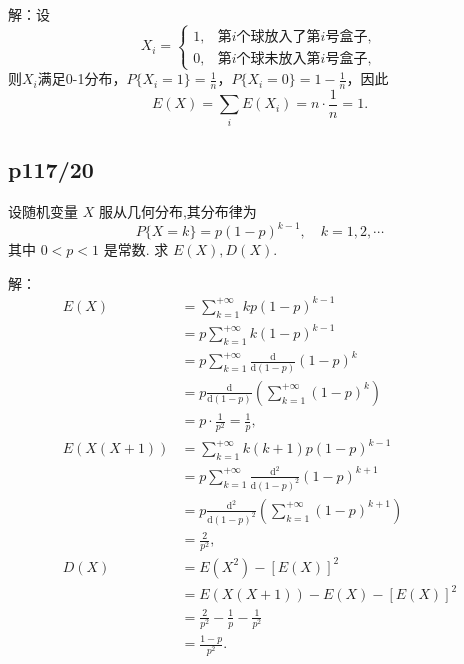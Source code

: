 \documentclass[UTF8,a4paper,10pt]{ctexart}
\begin{document}
解：设
\begin{equation}
    X_i = \left\{
    \begin{array}{lr}
    1,& \mbox{第$i$个球放入了第$i$号盒子}, \\
    0, & \mbox{第$i$个球未放入第$i$号盒子},
    \end{array}
    \right.
\end{equation}
则$X_i$满足0-1分布，$P\{X_i = 1\} = \displaystyle\frac{1}{n}$，$P\{X_i = 0\} = 1-\displaystyle\frac{1}{n}$，因此
\begin{equation}
    E(X) = \sum_i E(X_i) = n\cdot\frac{1}{n} = 1.
\end{equation}


\newpage
\subsection{p117/20}
设随机变量 $X$ 服从几何分布,其分布律为
$$
P\{X=k\}=p(1-p)^{k-1}, \quad k=1,2, \cdots
$$
其中 $0<p<1$ 是常数. 求 $E(X), D(X)$.

解：
\begin{align}
    E(X) &= \sum_{k = 1}^{+\infty}kp(1-p)^{k-1} \nonumber \\
         &= p\sum_{k = 1}^{+\infty}k(1-p)^{k-1} \nonumber \\
         &= p\sum_{k = 1}^{+\infty}\frac{\text{d}}{\text{d} (1 - p)}(1 - p)^k \nonumber \\
         &= p\frac{\text{d}}{\text{d} (1 - p)}\left(\sum_{k = 1}^{+\infty}(1 - p)^k\right) \nonumber \\
         &= p\cdot\frac{1}{p^2} = \frac{1}{p},\\
    E(X(X + 1)) &= \sum_{k = 1}^{+\infty}k(k + 1)p(1-p)^{k-1} \nonumber \\
                &= p\sum_{k = 1}^{+\infty}\frac{\text{d}^2}{\text{d} (1 - p)^2}(1 - p)^{k+1} \nonumber \\
                &= p\frac{\text{d}^2}{\text{d} (1 - p)^2}\left(\sum_{k = 1}^{+\infty}(1 - p)^{k+1}\right) \nonumber \\
                &= \frac{2}{p^2}, \\
    D(X) &= E(X^2) - [E(X)]^2 \nonumber \\
         &= E(X(X + 1)) - E(X) - [E(X)]^2 \nonumber \\
         &= \frac{2}{p^2} - \frac{1}{p} - \frac{1}{p^2} \nonumber \\
         &= \frac{1 - p}{p^2}.
\end{align}
\end{document}
